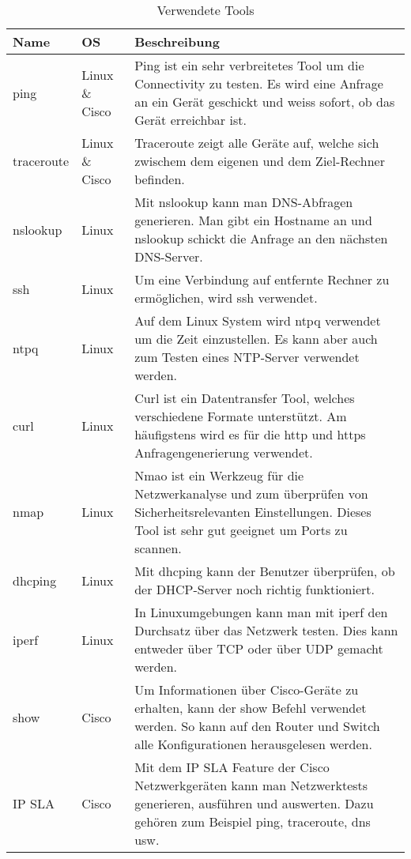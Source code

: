 \documentclass[a4,12pt]{scrartcl}
\begin{document}
\begin{table}[h!]
  \centering
  \caption{Verwendete Tools}
  \label{tab:table1}
  \begin{tabular}{l l p{9cm}}
    \toprule
    Name & OS & Beschreibung\\
    \midrule
    ping & Linux \& Cisco & Ping ist ein sehr verbreitetes Tool um die Connectivity zu testen. Es wird eine Anfrage an ein Gerät geschickt und weiss sofort, ob das Gerät erreichbar ist.\\
    traceroute & Linux \& Cisco & Traceroute zeigt alle Geräte auf, welche sich zwischem dem eigenen und dem Ziel-Rechner befinden.\\
    nslookup & Linux & Mit nslookup kann man DNS-Abfragen generieren. Man gibt ein Hostname an und nslookup schickt die Anfrage an den nächsten DNS-Server.\\
    ssh & Linux & Um eine Verbindung auf entfernte Rechner zu ermöglichen, wird ssh verwendet.\\
    ntpq & Linux & Auf dem Linux System wird ntpq verwendet um die Zeit einzustellen. Es kann aber auch zum Testen eines NTP-Server verwendet werden.\\
    curl & Linux & Curl ist ein Datentransfer Tool, welches verschiedene Formate unterstützt. Am häufigstens wird es für die http und https Anfragengenerierung verwendet.\\
    nmap & Linux & Nmao ist ein Werkzeug für die Netzwerkanalyse und zum überprüfen von Sicherheitsrelevanten Einstellungen. Dieses Tool ist sehr gut geeignet um Ports zu scannen.\\
    dhcping & Linux & Mit dhcping kann der Benutzer überprüfen, ob der DHCP-Server noch richtig funktioniert.\\
    iperf & Linux & In Linuxumgebungen kann man mit iperf den Durchsatz über das Netzwerk testen. Dies kann entweder über TCP oder über UDP gemacht werden.\\
    show & Cisco & Um Informationen über Cisco-Geräte zu erhalten, kann der show Befehl verwendet werden. So kann auf den Router und Switch alle Konfigurationen herausgelesen werden.\\
    IP SLA & Cisco &  Mit dem IP SLA Feature der Cisco Netzwerkgeräten kann man Netzwerktests generieren, ausführen und auswerten. Dazu gehören zum Beispiel ping, traceroute, dns usw. \\
    \bottomrule
  \end{tabular}
\end{table}
\end{document}
